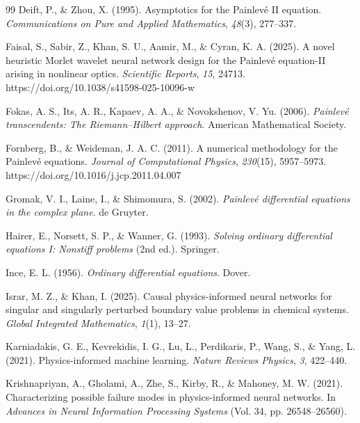 \documentclass[a4paper, 10pt]{article}
\theoremstyle{definition}
\begin{document}
\begin{thebibliography}{99}
Deift, P., \& Zhou, X. (1995). Asymptotics for the {Painlev\'e II} equation. \emph{Communications on Pure and Applied Mathematics}, \emph{48}(3), 277--337.

Faisal, S., Sabir, Z., Khan, S. U., Aamir, M., \& Cyran, K. A. (2025). A novel heuristic {Morlet} wavelet neural network design for the {Painlev\'e} equation-{II} arising in nonlinear optics. \emph{Scientific Reports}, \emph{15}, 24713. https://doi.org/10.1038/s41598-025-10096-w

Fokas, A. S., Its, A. R., Kapaev, A. A., \& Novokshenov, V. Yu. (2006). \emph{{Painlev\'e} transcendents: The {Riemann--Hilbert} approach}. American Mathematical Society.

Fornberg, B., \& Weideman, J. A. C. (2011). A numerical methodology for the {Painlev\'e} equations. \emph{Journal of Computational Physics}, \emph{230}(15), 5957--5973. https://doi.org/10.1016/j.jcp.2011.04.007

Gromak, V. I., Laine, I., \& Shimomura, S. (2002). \emph{{Painlev\'e} differential equations in the complex plane}. de Gruyter.

Hairer, E., Norsett, S. P., \& Wanner, G. (1993). \emph{Solving ordinary differential equations {I}: Nonstiff problems} (2nd ed.). Springer.

Ince, E. L. (1956). \emph{Ordinary differential equations}. Dover.

Israr, M. Z., \& Khan, I. (2025). Causal physics-informed neural networks for singular and singularly perturbed boundary value problems in chemical systems. \emph{Global Integrated Mathematics}, \emph{1}(1), 13--27.

Karniadakis, G. E., Kevrekidis, I. G., Lu, L., Perdikaris, P., Wang, S., \& Yang, L. (2021). Physics-informed machine learning. \emph{Nature Reviews Physics}, \emph{3}, 422--440.

Krishnapriyan, A., Gholami, A., Zhe, S., Kirby, R., \& Mahoney, M. W. (2021). Characterizing possible failure modes in physics-informed neural networks. In \emph{Advances in Neural Information Processing Systems} (Vol. 34, pp. 26548--26560).


\end{thebibliography}
\end{document}

